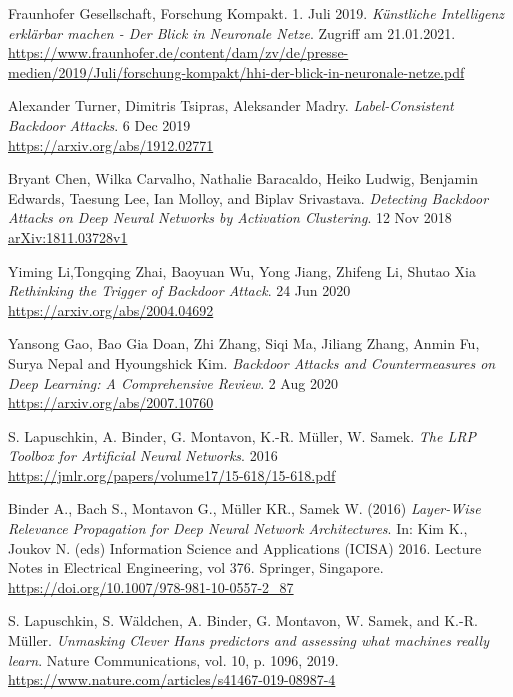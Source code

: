 \documentclass{article}
\theoremstyle{break}
\begin{document}
\newpage
\begin{thebibliography}{9}
	Fraunhofer Gesellschaft, Forschung Kompakt. 1. Juli 2019. 
	\textsl{Künstliche Intelligenz erklärbar machen - 
		Der Blick in Neuronale Netze}. Zugriff am 21.01.2021. \\
	\url{https://www.fraunhofer.de/content/dam/zv/de/presse-medien/2019/Juli/forschung-kompakt/hhi-der-blick-in-neuronale-netze.pdf}
	
	Alexander Turner, Dimitris Tsipras, Aleksander Madry.
	\textsl{Label-Consistent Backdoor Attacks}. 6 Dec 2019 \\
	\url{https://arxiv.org/abs/1912.02771}
	
	Bryant Chen, Wilka Carvalho, Nathalie Baracaldo, Heiko Ludwig, Benjamin Edwards, Taesung Lee, Ian Molloy, and Biplav Srivastava.
	\textsl{Detecting Backdoor Attacks on Deep Neural Networks by Activation Clustering}. 12 Nov 2018\\
	\url{arXiv:1811.03728v1}
	
	Yiming Li,Tongqing Zhai, Baoyuan Wu, Yong Jiang, Zhifeng Li, Shutao Xia
	\textsl{Rethinking the Trigger of Backdoor Attack}. 24 Jun 2020\\
	\url{https://arxiv.org/abs/2004.04692}
	
	 Yansong Gao, Bao Gia Doan, Zhi Zhang, Siqi Ma, Jiliang Zhang,
	Anmin Fu, Surya Nepal and Hyoungshick Kim. \textsl{Backdoor Attacks and Countermeasures on Deep Learning: A Comprehensive Review}. 2 Aug 2020 \\ \url{https://arxiv.org/abs/2007.10760}
	
	S. Lapuschkin, A. Binder, G. Montavon, K.-R. Müller, W. Samek.
	\textsl{The LRP Toolbox for Artificial Neural Networks}. 2016 \\
	\url{https://jmlr.org/papers/volume17/15-618/15-618.pdf}
	
	 Binder A., Bach S., Montavon G., Müller KR., Samek W. (2016) \textsl{Layer-Wise Relevance Propagation for Deep Neural Network Architectures}. In: Kim K., Joukov N. (eds) Information Science and Applications (ICISA) 2016. Lecture Notes in Electrical Engineering, vol 376. Springer, Singapore.\\ \url{https://doi.org/10.1007/978-981-10-0557-2\_87}
	
	S. Lapuschkin, S. Wäldchen, A. Binder, G. Montavon, W. Samek, and K.-R. Müller. \textsl{Unmasking Clever Hans predictors and assessing what machines really learn}. Nature Communications,
	vol. 10, p. 1096, 2019.\\
	\url{https://www.nature.com/articles/s41467-019-08987-4}
	

\end{thebibliography}
\end{document}
